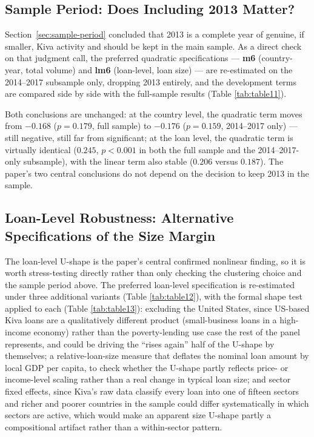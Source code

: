 \documentclass[12pt]{article}
\begin{document}
\subsection{Sample Period: Does Including 2013 Matter?}

Section~\ref{sec:sample-period} concluded that 2013 is a complete year of genuine, if smaller, Kiva
activity and should be kept in the main sample. As a direct check on that judgment call, the preferred
quadratic specifications --- \textbf{m6} (country-year, total volume) and \textbf{lm6} (loan-level, loan
size) --- are re-estimated on the 2014--2017 subsample only, dropping 2013 entirely, and the development
terms are compared side by side with the full-sample results (Table \ref{tab:table11}).



Both conclusions are unchanged: at the country level, the quadratic term
moves from $-0.168$ ($p=0.179$, full sample) to $-0.176$ ($p=0.159$, 2014--2017 only) --- still
negative, still far from significant; at the loan level, the quadratic term is virtually identical
($0.245$, $p<0.001$ in both the full sample and the 2014--2017-only subsample), with the linear term
also stable ($0.206$ versus $0.187$). The paper's two central conclusions do not depend on the
decision to keep 2013 in the sample.

\subsection{Loan-Level Robustness: Alternative Specifications of the Size Margin}

The loan-level U-shape is the paper's central confirmed nonlinear finding, so it is worth
stress-testing directly rather than only checking the clustering choice and the sample period above.
The preferred loan-level specification is re-estimated under three additional variants (Table
\ref{tab:table12}), with the formal shape test applied to each (Table \ref{tab:table13}): excluding the
United States, since US-based Kiva loans are a qualitatively different product (small-business loans in
a high-income economy) rather than the poverty-lending use case the rest of the panel represents, and
could be driving the ``rises again'' half of the U-shape by themselves; a relative-loan-size measure
that deflates the nominal loan amount by local GDP per capita, to check whether the U-shape partly
reflects price- or income-level scaling rather than a real change in typical loan size; and sector fixed
effects, since Kiva's raw data classify every loan into one of fifteen sectors and richer and poorer
countries in the sample could differ systematically in which sectors are active, which would make an
apparent size U-shape partly a compositional artifact rather than a within-sector pattern.
\end{document}

